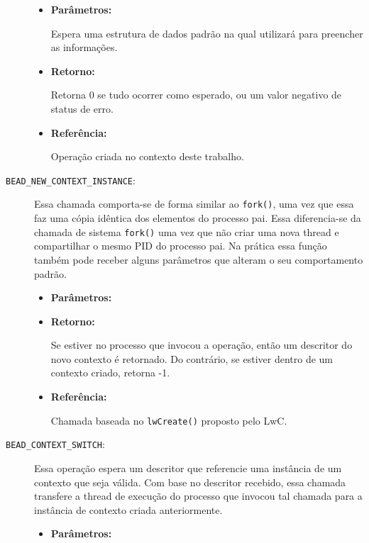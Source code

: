 \begin{description}
  \begin{itemize}
    \item \textbf{Parâmetros:}

Espera uma estrutura de dados padrão na qual utilizará para preencher as
informações.

    \item \textbf{Retorno:}

Retorna 0 se tudo ocorrer como esperado, ou um valor negativo de status de
erro.

    \item \textbf{Referência:}

Operação criada no contexto deste trabalho.

	\end{itemize}

  \item [\texttt{BEAD\_NEW\_CONTEXT\_INSTANCE}:]

Essa chamada comporta-se de forma similar ao \texttt{fork()}, uma vez que essa
faz uma cópia idêntica dos elementos do processo pai. Essa diferencia-se da
chamada de sistema \texttt{fork()} uma vez que não criar uma nova thread e
compartilhar o mesmo PID do processo pai. Na prática essa função também pode
receber alguns parâmetros que alteram o seu comportamento padrão.

  \begin{itemize}
    \item \textbf{Parâmetros:}

    \item \textbf{Retorno:}

Se estiver no processo que invocou a operação, então um descritor do novo
contexto é retornado. Do contrário, se estiver dentro de um contexto criado,
retorna -1.

    \item \textbf{Referência:}

Chamada baseada no \texttt{lwCreate()} proposto pelo LwC.

  \end{itemize}

  \item [\texttt{BEAD\_CONTEXT\_SWITCH}:]

Essa operação espera um descritor que referencie uma instância de um contexto
que seja válida. Com base no descritor recebido, essa chamada transfere a
thread de execução do processo que invocou tal chamada para a instância de
contexto criada anteriormente.

  \begin{itemize}
    \item \textbf{Parâmetros:}


\end{itemize}
\end{description}
